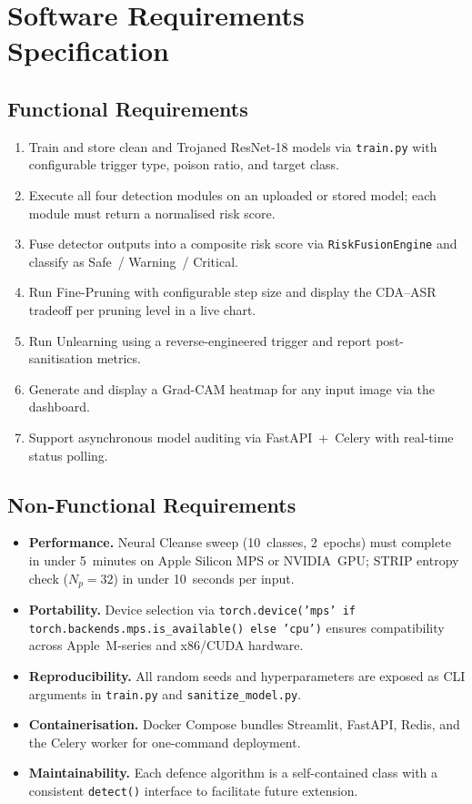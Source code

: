 \documentclass[12pt, letterpaper]{article}
\begin{document}
\section{Software Requirements Specification}
\label{sec:srs}

\subsection{Functional Requirements}

\begin{enumerate}
  \item Train and store clean and Trojaned ResNet-18 models via \texttt{train.py}
        with configurable trigger type, poison ratio, and target class.
  \item Execute all four detection modules on an uploaded or stored model;
        each module must return a normalised risk score.
  \item Fuse detector outputs into a composite risk score via
        \texttt{RiskFusionEngine} and classify as
        Safe~/ Warning~/ Critical.
  \item Run Fine-Pruning with configurable step size and display the
        CDA--ASR tradeoff per pruning level in a live chart.
  \item Run Unlearning using a reverse-engineered trigger and report
        post-sanitisation metrics.
  \item Generate and display a Grad-CAM heatmap for any input image
        via the dashboard.
  \item Support asynchronous model auditing via FastAPI~+~Celery with
        real-time status polling.
\end{enumerate}

\subsection{Non-Functional Requirements}

\begin{itemize}
  \item \textbf{Performance.}  Neural Cleanse sweep (10~classes, 2~epochs)
        must complete in under 5~minutes on Apple Silicon MPS or NVIDIA~GPU;
        STRIP entropy check ($N_p=32$) in under 10~seconds per input.
  \item \textbf{Portability.}  Device selection via
        \texttt{torch.device('mps' if torch.backends.mps.is\_available() else 'cpu')}
        ensures compatibility across Apple~M-series and x86/CUDA hardware.
  \item \textbf{Reproducibility.}  All random seeds and hyperparameters are
        exposed as CLI arguments in \texttt{train.py} and
        \texttt{sanitize\_model.py}.
  \item \textbf{Containerisation.}  Docker Compose bundles Streamlit,
        FastAPI, Redis, and the Celery worker for one-command deployment.
  \item \textbf{Maintainability.}  Each defence algorithm is a self-contained
        class with a consistent \texttt{detect()} interface to facilitate
        future extension.
\end{itemize}
\end{document}
